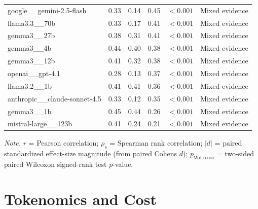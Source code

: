 \begin{table}[htbp]
\begin{tabular}{l r r r r l}
    google\_\_gemini-2.5-flash & 0.33 & 0.14 & 0.45 & $<0.001$ & Mixed evidence \\ %
    llama3.3\_\_70b & 0.33 & 0.17 & 0.41 & $<0.001$ & Mixed evidence \\ %
    gemma3\_\_27b & 0.38 & 0.31 & 0.41 & $<0.001$ & Mixed evidence \\ %
    gemma3\_\_4b & 0.44 & 0.40 & 0.38 & $<0.001$ & Mixed evidence \\ %
    gemma3\_\_12b & 0.41 & 0.32 & 0.38 & $<0.001$ & Mixed evidence \\ %
    openai\_\_gpt-4.1 & 0.28 & 0.13 & 0.37 & $<0.001$ & Mixed evidence \\ %
    llama3.2\_\_1b & 0.41 & 0.41 & 0.36 & $<0.001$ & Mixed evidence \\ %
    anthropic\_\_claude-sonnet-4.5 & 0.33 & 0.12 & 0.35 & $<0.001$ & Mixed evidence \\ %
    gemma3\_\_1b & 0.45 & 0.44 & 0.26 & $<0.001$ & Mixed evidence \\ %
    mistral-large\_\_123b & 0.41 & 0.24 & 0.21 & $<0.001$ & Mixed evidence \\ %
\bottomrule
\end{tabular}
\vspace{0.4em}
\footnotesize
\textit{Note.} $r$ = Pearson correlation; $\rho_s$ = Spearman rank correlation; $|d|$ = paired standardized effect-size magnitude (from paired Cohens $d$); $p_{\text{Wilcoxon}}$ = two-sided paired Wilcoxon signed-rank test $p$-value.
\end{table}




\clearpage
\section{Tokenomics and Cost}\label{sec:results_cost}

